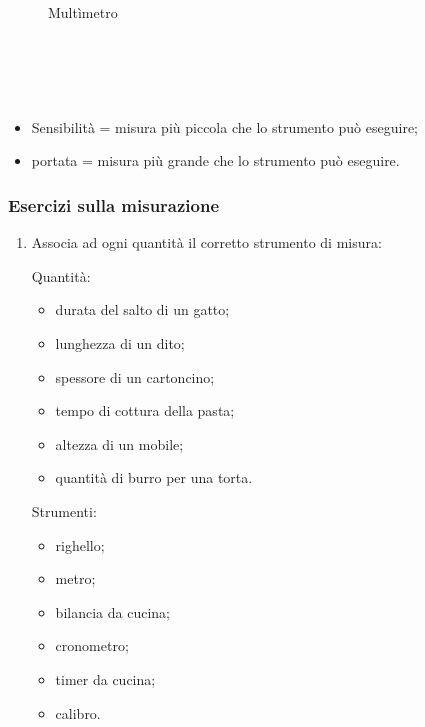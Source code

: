 \documentclass[handout]{beamer}
\theoremstyle{plain}
\begin{document}
\begin{frame}
\begin{columns}
\begin{column}{0.25\textwidth}
\begin{figure}
    Multìmetro
  \end{figure}    
  \end{column}
\end{columns}\pause

~

~

\begin{itemize}
  \item Sensibilità = misura più piccola che lo strumento può eseguire;
  \item portata = misura più grande che lo strumento può eseguire.
\end{itemize}
\end{frame}



\begin{frame}
\frametitle{Esercizi sulla misurazione}
\begin{enumerate}
  \item Associa ad ogni quantità il corretto strumento di misura:
  \begin{multicols}{2}
    Quantità:
    \begin{itemize}
        \item durata del salto di un gatto;
        \item lunghezza di un dito;
        \item spessore di un cartoncino;
        \item tempo di cottura della pasta;
        \item altezza di un mobile;
        \item quantità di burro per una torta.
    \end{itemize}
    Strumenti:
    \begin{itemize}
      \item righello;
      \item metro;
      \item bilancia da cucina;
      \item cronometro;
      \item timer da cucina;
      \item calibro.
    \end{itemize}

    ~

    ~
  \end{multicols}
\end{enumerate}
\end{frame}
\end{document}
